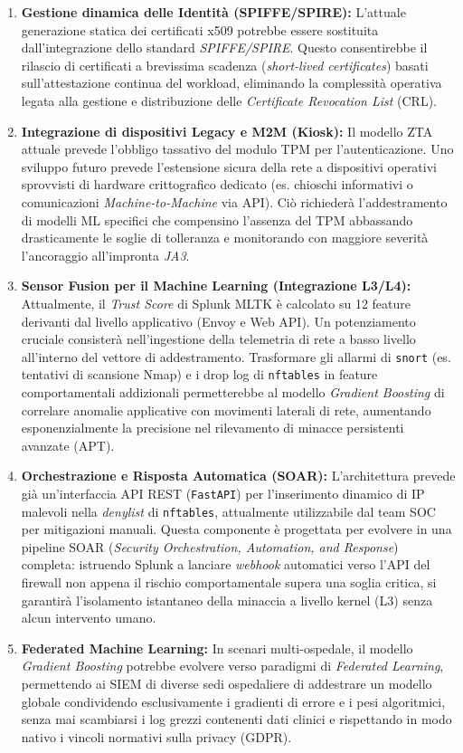 \begin{enumerate}
    \item \textbf{Gestione dinamica delle Identità (SPIFFE/SPIRE):} L'attuale generazione statica dei certificati x509 potrebbe essere sostituita dall'integrazione dello standard \textit{SPIFFE/SPIRE}. Questo consentirebbe il rilascio di certificati a brevissima scadenza (\textit{short-lived certificates}) basati sull'attestazione continua del workload, eliminando la complessità operativa legata alla gestione e distribuzione delle \textit{Certificate Revocation List} (CRL).
    
    \item \textbf{Integrazione di dispositivi Legacy e M2M (Kiosk):} Il modello ZTA attuale prevede l'obbligo tassativo del modulo TPM per l'autenticazione. Uno sviluppo futuro prevede l'estensione sicura della rete a dispositivi operativi sprovvisti di hardware crittografico dedicato (es. chioschi informativi o comunicazioni \textit{Machine-to-Machine} via API). Ciò richiederà l'addestramento di modelli ML specifici che compensino l'assenza del TPM abbassando drasticamente le soglie di tolleranza e monitorando con maggiore severità l'ancoraggio all'impronta \textit{JA3}.
    
    \item \textbf{Sensor Fusion per il Machine Learning (Integrazione L3/L4):} Attualmente, il \textit{Trust Score} di Splunk MLTK è calcolato su 12 feature derivanti dal livello applicativo (Envoy e Web API). Un potenziamento cruciale consisterà nell'ingestione della telemetria di rete a basso livello all'interno del vettore di addestramento. Trasformare gli allarmi di \texttt{snort} (es. tentativi di scansione Nmap) e i drop log di \texttt{nftables} in feature comportamentali addizionali permetterebbe al modello \textit{Gradient Boosting} di correlare anomalie applicative con movimenti laterali di rete, aumentando esponenzialmente la precisione nel rilevamento di minacce persistenti avanzate (APT).

    \item \textbf{Orchestrazione e Risposta Automatica (SOAR):} L'architettura prevede già un'interfaccia API REST (\texttt{FastAPI}) per l'inserimento dinamico di IP malevoli nella \textit{denylist} di \texttt{nftables}, attualmente utilizzabile dal team SOC per mitigazioni manuali. Questa componente è progettata per evolvere in una pipeline SOAR (\textit{Security Orchestration, Automation, and Response}) completa: istruendo Splunk a lanciare \textit{webhook} automatici verso l'API del firewall non appena il rischio comportamentale supera una soglia critica, si garantirà l'isolamento istantaneo della minaccia a livello kernel (L3) senza alcun intervento umano.
    
    \item \textbf{Federated Machine Learning:} In scenari multi-ospedale, il modello \textit{Gradient Boosting} potrebbe evolvere verso paradigmi di \textit{Federated Learning}, permettendo ai SIEM di diverse sedi ospedaliere di addestrare un modello globale condividendo esclusivamente i gradienti di errore e i pesi algoritmici, senza mai scambiarsi i log grezzi contenenti dati clinici e rispettando in modo nativo i vincoli normativi sulla privacy (GDPR).
\end{enumerate}